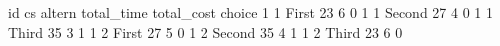   {\TLC}
  {\VBAR} id   cs   altern   total_time   total_cost   choice {\VBAR}
  {\LFTT}
  {\VBAR}  1    1    First           23            6        0 {\VBAR}
  {\VBAR}  1    1   Second           27            4        0 {\VBAR}
  {\VBAR}  1    1    Third           35            3        1 {\VBAR}
  {\LFTT}
  {\VBAR}  1    2    First           27            5        0 {\VBAR}
  {\VBAR}  1    2   Second           35            4        1 {\VBAR}
  {\VBAR}  1    2    Third           23            6        0 {\VBAR}
  {\BLC}
